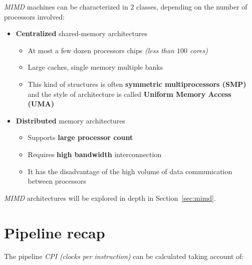 \documentclass[english]{article}
\begin{document}
\textit{MIMD} machines can be characterized in \(2\) classes, depending on the number of processors involved:

\begin{itemize}
  \item \textbf{Centralized} shared-memory architectures
        \begin{itemize}
          \item At most a few dozen processors chips \textit{(less than \(100\) cores)}
          \item Large caches, single memory multiple banks
          \item This kind of structures is often \textbf{symmetric multiprocessors (SMP)} and the style of architecture is called \textbf{Uniform Memory Access (UMA)}
        \end{itemize}
  \item \textbf{Distributed} memory architectures
        \begin{itemize}
          \item Supports \textbf{large processor count}
          \item Requires \textbf{high bandwidth} interconnection
          \item It has the disadvantage of the high volume of data communication between processors
        \end{itemize}
\end{itemize}

\bigskip
\textit{MIMD} architectures will be explored in depth in Section~\ref{sec:mimd}.

\clearpage

\section{Pipeline recap}

The pipeline \textit{CPI} \textit{(clocks per instruction)} can be calculated taking account of:
\end{document}
